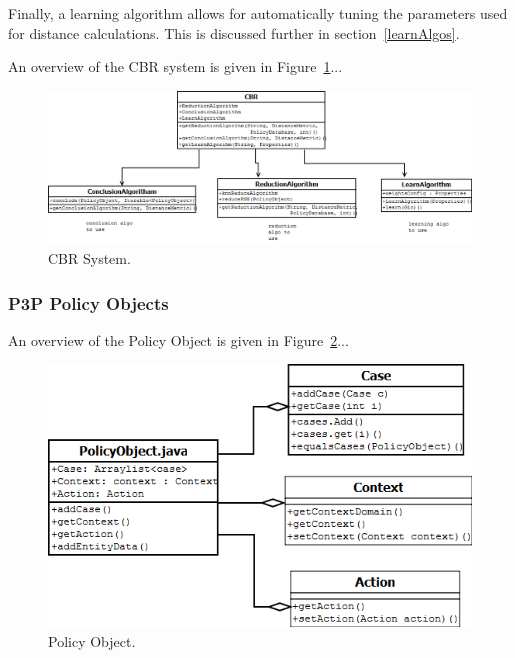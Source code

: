 Finally, a learning algorithm allows for automatically tuning the parameters used for distance calculations. This is discussed further in section~\ref{learnAlgos}.

An overview of the CBR system is given in Figure~\ref{cbr_fig}...


\begin{figure}[htbp]
\begin{center}
\includegraphics[width = \textwidth]{DesignReport/uml/CBR.png}
\caption{CBR System.}
\label{cbr_fig}
\end{center}
\end{figure}


\subsubsection{P3P Policy Objects}
An overview of the Policy Object is given in Figure~\ref{po_fig}...
\begin{figure}[htbp]
\begin{center}
\includegraphics[width = \textwidth]{DesignReport/uml/po.png}
\caption{Policy Object.}
\label{po_fig}
\end{center}
\end{figure}

